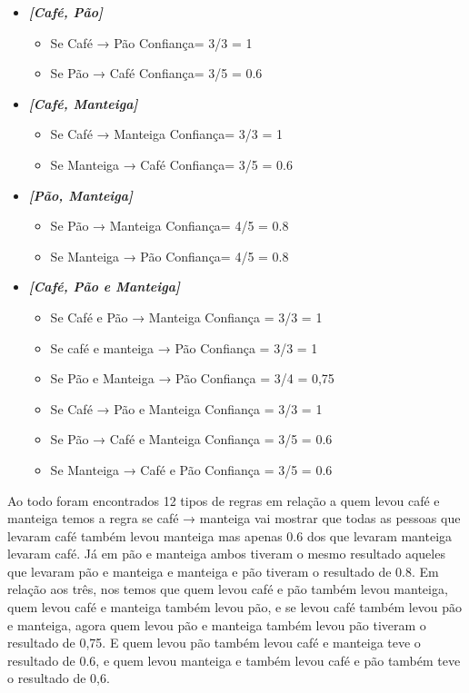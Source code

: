 \documentclass[12pt]{article}
\begin{document}
\begin{itemize}
	\item \textbf{\textit{[Café, Pão]}}
	      \begin{itemize}
		      \item Se Café → Pão	Confiança= 3/3 = 1
		      \item Se Pão  → Café	Confiança= 3/5 = 0.6
	      \end{itemize}
	\item \textbf{\textit{[Café, Manteiga]}}
	      \begin{itemize}
		      \item Se Café → Manteiga     Confiança= 3/3 = 1
		      \item Se Manteiga → Café	 Confiança= 3/5 = 0.6
	      \end{itemize}
	\item  \textbf{\textit{[Pão, Manteiga]}}
	      \begin{itemize}
		      \item Se Pão → Manteiga	  Confiança= 4/5 = 0.8
		      \item Se Manteiga → Pão	  Confiança= 4/5 = 0.8
	      \end{itemize}
	\item \textbf{\textit{[Café, Pão e Manteiga]}}
	      \begin{itemize}
		      \item Se Café e Pão → Manteiga	Confiança = 3/3 = 1
		      \item Se café e manteiga → Pão	Confiança = 3/3 = 1
		      \item Se Pão e Manteiga → Pão	Confiança = 3/4 = 0,75
		      \item Se Café → Pão e Manteiga	Confiança = 3/3 = 1
		      \item Se Pão → Café e Manteiga	Confiança = 3/5 = 0.6
		      \item Se Manteiga → Café e Pão 	Confiança = 3/5 = 0.6
	      \end{itemize}


\end{itemize}

Ao todo foram encontrados 12 tipos de regras em relação a quem levou café e manteiga temos a regra se café → manteiga vai mostrar que todas as pessoas que levaram café também levou manteiga mas apenas 0.6 dos que levaram manteiga levaram café.
Já em pão e manteiga ambos tiveram o mesmo resultado aqueles que levaram pão e manteiga e manteiga e pão tiveram o resultado de 0.8.
Em relação aos três, nos temos que quem levou café e pão também levou manteiga, quem levou café e manteiga também levou pão, e se levou café também levou pão e manteiga, agora quem levou pão e manteiga também levou pão tiveram o resultado de 0,75.
E quem levou pão também levou café e manteiga teve o resultado de 0.6, e quem levou manteiga e também levou café e pão também teve o resultado de 0,6.
\end{document}
